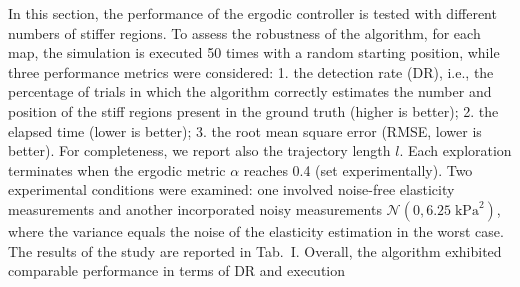 \documentclass[11pt]{article}
\begin{document}
In this section, the performance of the ergodic controller is tested
with different numbers of stiffer regions. To assess the robustness
of the algorithm, for each map, the simulation is executed 50 times
with a random starting position, while three performance metrics
were considered: 1. the detection rate (DR), i.e., the percentage of
trials in which the algorithm correctly estimates the number and
position of the stiff regions present in the ground truth (higher is
better); 2. the elapsed time (lower is better); 3. the root mean
square error (RMSE, lower is better). For completeness, we report
also the trajectory length $l$. Each exploration terminates when the
ergodic metric $\alpha$ reaches 0.4 (set experimentally). Two
experimental conditions were examined: one involved noise-free
elasticity measurements and another incorporated noisy measurements
$\mathcal{N}(0, 6.25\;\mathrm{kPa}^{2})$, where the variance equals
the noise of the elasticity estimation in the worst case. The
results of the study are reported in Tab.~I. Overall, the algorithm
exhibited comparable performance in terms of DR and execution

\newpage

\setcounter{equation}{5}

\begin{center}
\end{center}
\end{document}
